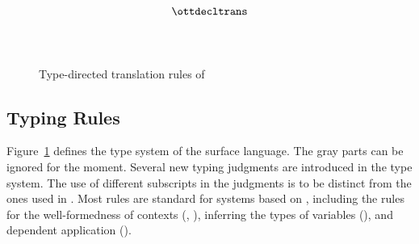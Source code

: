 \begin{comment}
\paragraph{Syntactic Sugar}
For the sake of programming, \sufcc employs some syntactic sugar shown
in Figure \ref{fig:surface:syntax}. A non-dependent function type can
be written as $[[A1 -> A2]]$. A dependent function type
$[[Pi x : A1 . A2]]$ is abbreviated as $[[(x : A1) -> A2]]$ for easier
reading. A standard $\mathbf{letrec}$ construct is used to build
recursive functions. We also introduce a Haskell-like record syntax,
which are desugared to datatypes with accompanying selector functions.
\end{comment}

\begin{figure}[htpb]
\begin{small}
\centering
\renewcommand{\ottinterrule}{\\[1.0mm]}
\begin{spacing}{1.2}
\renewcommand{\ottdrule}[4][]{{\inferrule{#2 }{#3}\,{\scriptsize \ottdrulename{#4}}}}
\renewenvironment{ottdefnblock}[3][]{\raggedright \framebox{\mbox{#2}} \quad #3 \\[0pt]}{}
\renewcommand{\ottusedrule}[1]{$#1\quad$}
\ottdefnctxtrans{}\ottinterrule
\ottdefnpgmtrans{}\ottinterrule
\ottdefndecltrans{}
\[\hlmath{\ottdecltrans}\]\ottinterrule %
\ottdefnpattrans{}\ottinterrule
\ottdefnexprtrans{}
\end{spacing}
\end{small}
\caption{Type-directed translation rules of \sufcc}
\label{fig:source:translate}
\end{figure}

\subsection{Typing Rules}
Figure~\ref{fig:source:translate} defines the type system of the
surface language. The gray parts can be ignored for the
moment. Several new typing judgments are introduced in the type
system. The use of different subscripts in the judgments is to be
distinct from the ones used in \ecore. Most rules are standard for
systems based on \coc, including the rules for the well-formedness of
contexts (, ), inferring the
types of variables (), and dependent application
().

